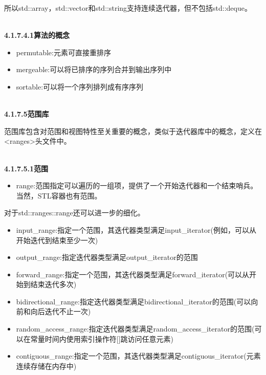 所以std::array，std::vector和std::string支持连续迭代器，但不包括std::deque。

\hspace*{\fill} \\ %
\noindent
\textbf{4.1.7.4.1\hspace{0.2cm}算法的概念}

\begin{itemize}
\item
permutable:元素可直接重排序

\item
mergeable:可以将已排序的序列合并到输出序列中

\item
sortable:可以将一个序列排列成有序序列
\end{itemize}

\hspace*{\fill} \\ %
\noindent
\textbf{4.1.7.5\hspace{0.2cm}范围库}

范围库包含对范围和视图特性至关重要的概念，类似于迭代器库中的概念，定义在<ranges>头文件中。

\hspace*{\fill} \\ %
\noindent
\textbf{4.1.7.5.1\hspace{0.2cm}范围}

\begin{itemize}
\item
range:范围指定可以遍历的一组项，提供了一个开始迭代器和一个结束哨兵。当然，STL容器也有范围。
\end{itemize}

对于std::ranges::range还可以进一步的细化。

\begin{itemize}
\item
input\_range:指定一个范围，其迭代器类型满足input\_iterator(例如，可以从开始迭代到结束至少一次)

\item
output\_range:指定迭代器类型满足output\_iterator的范围

\item
forward\_range:指定一个范围，其迭代器类型满足forward\_iterator(可以从开始到结束迭代多次)

\item
bidirectional\_range:指定迭代器类型满足bidirectional\_iterator的范围(可以向前和向后迭代不止一次)

\item
random\_access\_range:指定迭代器类型满足random\_access\_iterator的范围(可以在常量时间内使用索引操作符[]跳访问任意元素)

\item
contiguous\_range:指定一个范围，其迭代器类型满足contiguous\_iterator(元素连续存储在内存中)
\end{itemize}


